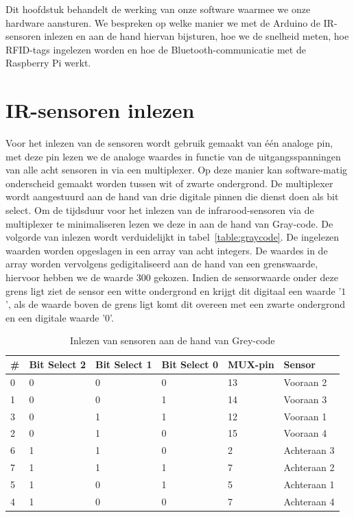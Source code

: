 Dit hoofdstuk behandelt de werking van onze software waarmee we onze hardware aansturen. We bespreken op welke manier we met de Arduino de IR-sensoren inlezen en aan de hand hiervan bijsturen, hoe we de snelheid meten, hoe RFID-tags ingelezen worden en hoe de Bluetooth-communicatie met de Raspberry Pi werkt.

\section{IR-sensoren inlezen}
Voor het inlezen van de sensoren wordt gebruik gemaakt van \'e\'en analoge pin, met deze pin lezen we de analoge waardes in functie van de uitgangsspanningen van alle acht sensoren in via een multiplexer. Op deze manier kan software-matig onderscheid gemaakt worden tussen wit of zwarte ondergrond. De multiplexer wordt aangestuurd aan de hand van drie digitale pinnen die dienst doen als bit select. Om de tijdsduur voor het inlezen van de infrarood-sensoren via de multiplexer te minimaliseren lezen we deze in aan de hand van Gray-code. De volgorde van inlezen wordt verduidelijkt in tabel~\vref{table:graycode}. De ingelezen waarden worden opgeslagen in een array van acht integers. De waardes in de array worden vervolgens gedigitaliseerd aan de hand van een grenswaarde, hiervoor hebben we de waarde $300$ gekozen. Indien de sensorwaarde onder deze grens ligt ziet de sensor een witte ondergrond en krijgt dit digitaal een waarde '$1$', als de waarde boven de grens ligt komt dit overeen met een zwarte ondergrond en een digitale waarde '$0$'. 

\begin{table}[H]
	\centering
	\begin{tabular}{|l|l|l|l|l|l|}
		\hline
		\# & Bit Select 2 & Bit Select 1 & Bit Select 0 & MUX-pin & Sensor      \\ \hline
		0  & 0            & 0            & 0            & 13      & Vooraan 2   \\ \hline
		1  & 0            & 0            & 1            & 14      & Vooraan 3   \\ \hline
		3  & 0            & 1            & 1            & 12      & Vooraan 1   \\ \hline
		2  & 0            & 1            & 0            & 15      & Vooraan 4   \\ \hline
		6  & 1            & 1            & 0            & 2       & Achteraan 3 \\ \hline
		7  & 1            & 1            & 1            & 7       & Achteraan 2 \\ \hline
		5  & 1            & 0            & 1            & 5       & Achteraan 1 \\ \hline
		4  & 1            & 0            & 0            & 7       & Achteraan 4 \\ \hline
	\end{tabular}
	\caption{Inlezen van sensoren aan de hand van Grey-code}
	\label{table:graycode}
\end{table}

